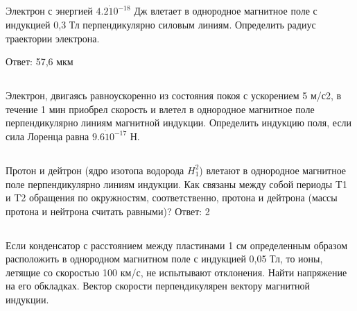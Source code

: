 \documentclass[a4paper,12pt]{article} %
\begin{document}
\subsection{}

Электрон с энергией $4.2\dot 10^{-18}$  Дж влетает в однородное магнитное поле с индукцией 0,3 Тл перпендикулярно силовым линиям. Определить радиус траектории электрона. 

Ответ: 57,6 мкм

\subsection{}

Электрон, двигаясь равноускоренно из состояния покоя с ускорением 5 м/с2, в течение 1 мин приобрел скорость и влетел в однородное магнитное поле перпендикулярно линиям магнитной индукции. Определить индукцию поля, если сила Лоренца равна  $9.6\dot 10^{-17}$ Н.


\subsection{}

Протон и дейтрон (ядро изотопа водорода $H^2_1 $) влетают в однородное магнитное поле перпендикулярно линиям индукции. Как связаны между собой периоды T1 и T2 обращения по окружностям, соответственно, протона и дейтрона (массы протона и нейтрона считать равными)? 
Ответ:  2 


\subsection{}

Если конденсатор с расстоянием между пластинами 1 см определенным образом расположить в однородном магнитном поле с индукцией 0,05 Тл, то ионы, летящие со скоростью 100 км/с, не испытывают отклонения. Найти напряжение на его обкладках. Вектор скорости перпендикулярен вектору магнитной индукции.
\end{document}
